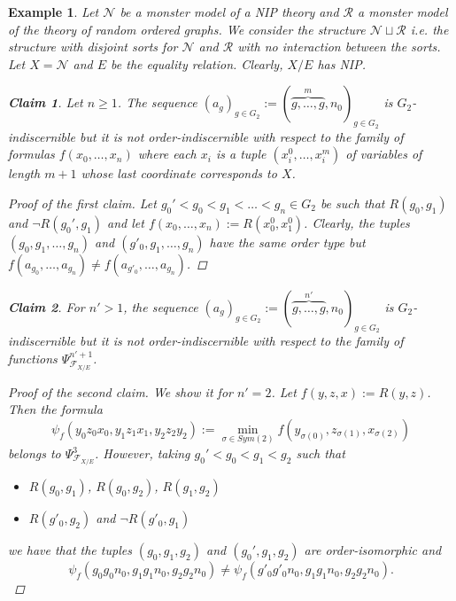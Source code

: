 \documentclass{amsart}
\newtheorem*{claim}{Claim}
\newtheorem{external claim}[teor]{Claim}
\newtheorem{example}[teor]{Example}
\begin{document}
\begin{example}\label{example optimal}
    Let $\mathcal{N}$ be a monster model of a NIP theory and $\mathcal{R}$ a monster model of the theory of random ordered graphs. We consider the structure $\mathcal{N}\sqcup \mathcal{R}$ i.e. the structure with disjoint sorts for $\mathcal{N}$ and $\mathcal{R}$ with no interaction between the sorts. Let $X=\mathcal{N}$ and $E$ be the equality relation. Clearly, $X/E$ has NIP.

    \begin{claim}
        Let $n\geq 1$. The sequence $(a_g)_{g\in G_2}:=(\overbrace{g,\dots,g}^m,n_0)_{g\in G_2}$ is $G_2$-indiscernible but it is not order-indiscernible with respect to the family of formulas $f(x_0,\dots,x_n)$ where each $x_i$ is a tuple $(x_i^0,\dots,x_i^m)$ of variables of length $m+1$ whose last coordinate corresponds to $X$.
    \end{claim}

    \begin{proof}[Proof of the first claim]
    Let $g_0'<g_0<g_1<\dots<g_n\in G_2$ be such that $R(g_0,g_1)$ and $\neg R(g_0',g_1)$ and let $f(x_0,\dots,x_n):= R(x_0^0,x_1^0)$. Clearly, the tuples $(g_0,g_1,\dots,g_n)$ and $(g'_0,g_1,\dots,g_n)$ have the same order type but $f(a_{g_0},\dots,a_{g_n})\neq f(a_{g'_0},\dots,a_{g_n}) $.
    \end{proof}

    \begin{claim}
        For $n'>1$, the sequence $(a_g)_{g\in G_2}:=(\overbrace{g,\dots,g}^{n'},n_0)_{g\in G_2}$ is $G_2$-indiscernible but it is not order-indiscernible with respect to the family of functions $\Psi^{n'+1}_{\mathcal{F}_{X/E}}$.
    \end{claim}

    \begin{proof}[Proof of the second claim]
        We show it for $n'=2$. %
        Let $f(y,z,x):=R(y,z)$. Then the formula $$\psi_f(y_0z_0x_0,y_1z_1x_1,y_2z_2y_2):=\min_{\sigma\in Sym(2)} f(y_{\sigma(0)},z_{\sigma(1)},x_{\sigma(2)})$$ belongs to $\Psi^{3}_{\mathcal{F}_{X/E}}$. However, taking  $g_0'<g_0<g_1<g_2$ such that \begin{itemize}
            \item $R(g_0,g_1)$, $R(g_0,g_2)$, $R(g_1,g_2)$
            \item $R(g'_0,g_2)$ and  $\neg R(g'_0,g_1)$
        \end{itemize}
        we have that the tuples $(g_0,g_1,g_2)$ and $(g_0',g_1,g_2)$ are order-isomorphic and $$\psi_f(g_0g_0n_0,g_1g_1n_0,g_2g_2n_0)\neq \psi_f(g'_0g'_0n_0,g_1g_1n_0,g_2g_2n_0).$$
    \end{proof}
\end{example}
\printbibliography
\end{document}
